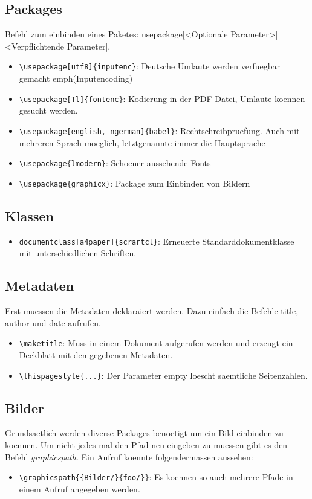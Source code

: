 \documentclass[11pt]{report}
\begin{document}
\subsection{Packages}
Befehl zum einbinden eines Paketes: 
usepackage[<Optionale Parameter>]{<Verpflichtende Parameter}|.
\begin{itemize}
  \item \verb|\usepackage[utf8]{inputenc}|: Deutsche Umlaute werden verfuegbar gemacht emph{(Inputencoding)}
  \item \verb|\usepackage[Tl]{fontenc}|: Kodierung in der PDF-Datei, Umlaute koennen gesucht werden. 
  \item \verb|\usepackage[english, ngerman]{babel}|: Rechtschreibpruefung. Auch mit mehreren Sprach moeglich, letztgenannte immer die Hauptsprache
  \item \verb|\usepackage{lmodern}|: Schoener aussehende Fonts
  \item \verb|\usepackage{graphicx}|: Package zum Einbinden von Bildern
\end{itemize}

\subsection{Klassen}
\begin{itemize}
  \item \verb|documentclass[a4paper]{scrartcl}|: Erneuerte Standarddokumentklasse mit unterschiedlichen Schriften.
\end{itemize}

\subsection{Metadaten}
Erst muessen die Metadaten deklaraiert werden. Dazu einfach die Befehle title, author und date aufrufen. 
\begin{itemize}
  \item \verb|\maketitle|: Muss in einem Dokument aufgerufen werden und erzeugt ein Deckblatt mit den gegebenen Metadaten.
  \item \verb|\thispagestyle{...}|: Der Parameter empty loescht saemtliche Seitenzahlen. 
\end{itemize}

\subsection{Bilder}
Grundsaetlich werden diverse Packages benoetigt um ein Bild einbinden zu koennen. Um nicht jedes mal den Pfad neu eingeben zu muessen gibt es den Befehl \emph{graphicspath}. Ein Aufruf koennte folgendermassen aussehen: 
\begin{itemize}
	\item \verb|\graphicspath{{Bilder/}{foo/}}|: Es koennen so auch mehrere Pfade in einem Aufruf angegeben werden. 
\end{itemize}
\end{document}
